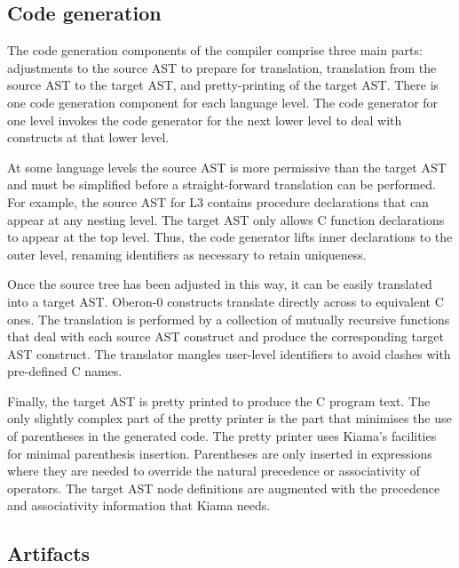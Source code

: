 \subsection{Code generation}
\label{sec:kiama-codegen}

The code generation components of the compiler comprise three main parts: adjustments to the source AST to prepare for translation, translation from the source AST to the target AST, and pretty-printing of the target AST.
There is one code generation component for each language level.
The code generator for one level invokes the code generator for the next lower level to deal with constructs at that lower level.

At some language levels the source AST is more permissive than the target AST and must be simplified before a straight-forward translation can be performed.
For example, the source AST for L3 contains procedure declarations that can appear at any nesting level.
The target AST only allows C function declarations to appear at the top level.
Thus, the code generator lifts inner declarations to the outer level, renaming identifiers as necessary to retain uniqueness.

Once the source tree has been adjusted in this way, it can be easily translated into a target AST.
Oberon-0 constructs translate directly across to equivalent C ones.
The translation is performed by a collection of mutually recursive functions that deal with each source AST construct and produce the corresponding target AST construct.
The translator mangles user-level identifiers to avoid clashes with pre-defined C names.

Finally, the target AST is pretty printed to produce the C program text.
The only slightly complex part of the pretty printer is the part that minimises the use of parentheses in the generated code.
The pretty printer uses Kiama's facilities for minimal parenthesis insertion.
Parentheses are only inserted in expressions where they are needed to override the natural precedence or associativity of operators.
The target AST node definitions are augmented with the precedence and associativity information that Kiama needs.

\subsection{Artifacts}
\label{sec:kiama-artifacts}

\newcommand{\head}[1]{\multicolumn{1}{c|}{\emph{#1}}}
\newcommand{\cell}[2]{\multicolumn{1}{c|}{\begin{tabular}{c}#1 \\ \emph{#2}\end{tabular}}}

